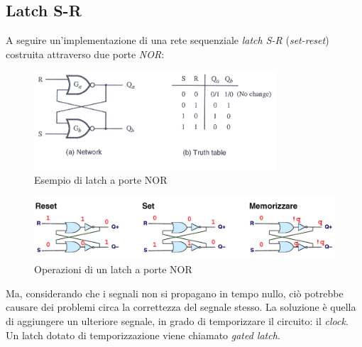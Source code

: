\documentclass[class=book, crop=false]{standalone}
\begin{document}
\subsection*{Latch S-R}
A seguire un'implementazione di una rete sequenziale \emph{latch S-R} (\emph{set-reset}) costruita attraverso due porte \emph{NOR}:
\begin{figure}[H]
	\centering
	\includegraphics[width=0.8\textwidth,keepaspectratio]{es_latch.png}
	\caption{Esempio di latch a porte NOR}
\end{figure}
\begin{figure}[H]
	\centering
	\includegraphics[width=\textwidth,keepaspectratio]{operazioni_latch.png}
	\caption{Operazioni di un latch a porte NOR}
\end{figure}
Ma, considerando che i segnali non si propagano in tempo nullo, ciò potrebbe causare dei problemi circa la correttezza del segnale stesso. La soluzione è quella di aggiungere un ulteriore segnale, in grado di temporizzare il circuito: il \emph{clock}. Un latch dotato di temporizzazione viene chiamato \emph{gated latch}.
\end{document}
